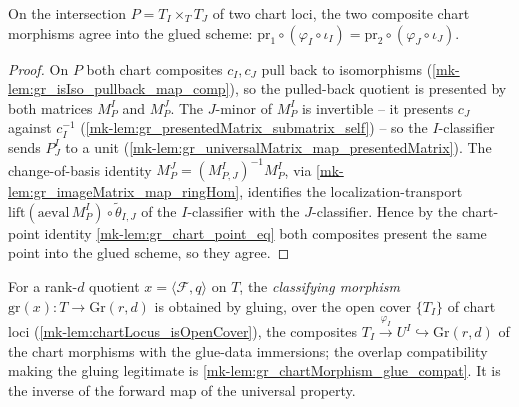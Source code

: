 \begin{lemma}\label{mk-lem:gr_chartMorphism_glue_compat}
  \leanok

  On the intersection \(P = T_I \times_T T_J\) of two chart loci, the two composite chart
  morphisms agree into the glued scheme:
  \(\mathrm{pr}_1 \circ (\varphi_I \circ \iota_I) = \mathrm{pr}_2 \circ (\varphi_J \circ
  \iota_J)\).
\end{lemma}
\begin{proof}
  On \(P\) both chart composites \(c_I, c_J\) pull back to isomorphisms
  (\ref{mk-lem:gr_isIso_pullback_map_comp}), so the pulled-back quotient is presented by both
  matrices \(M^I_P\) and \(M^J_P\). The \(J\)-minor of \(M^I_P\) is invertible -- it presents
  \(c_J\) against \(c_I^{-1}\) (\ref{mk-lem:gr_presentedMatrix_submatrix_self}) -- so the
  \(I\)-classifier sends \(P^I_J\) to a unit
  (\ref{mk-lem:gr_universalMatrix_map_presentedMatrix}). The change-of-basis identity
  \(M^J_P = (M^I_{P,J})^{-1} M^I_P\), via \ref{mk-lem:gr_imageMatrix_map_ringHom}, identifies the
  localization-transport \(\mathrm{lift}(\mathrm{aeval}\,M^I_P)\circ\tilde\theta_{I,J}\) of the
  \(I\)-classifier with the \(J\)-classifier. Hence by the chart-point identity
  \ref{mk-lem:gr_chart_point_eq} both composites present the same point into the glued scheme,
  so they agree.
\end{proof}

\begin{definition}\label{mk-def:grPointOfRankQuotient}
  \leanok

  For a rank-\(d\) quotient \(x = \langle \mathcal{F}, q\rangle\) on \(T\), the
  \emph{classifying morphism} \(\mathrm{gr}(x) : T \to \mathrm{Gr}(r,d)\) is obtained by
  gluing, over the open cover \(\{T_I\}\) of chart loci (\ref{mk-lem:chartLocus_isOpenCover}),
  the composites \(T_I \xrightarrow{\varphi_I} U^I \hookrightarrow \mathrm{Gr}(r,d)\) of the
  chart morphisms with the glue-data immersions; the overlap compatibility making the gluing
  legitimate is \ref{mk-lem:gr_chartMorphism_glue_compat}. It is the inverse of the forward map
  of the universal property.
\end{definition}


